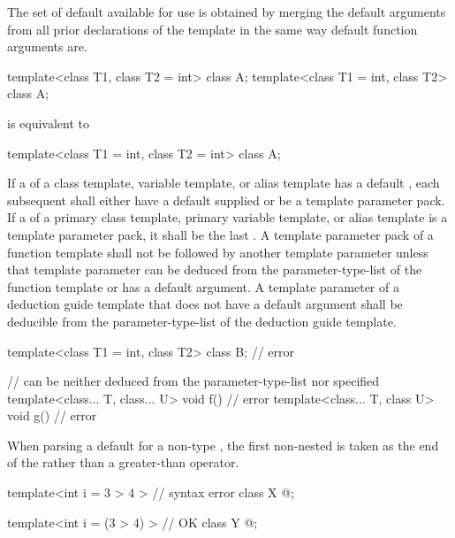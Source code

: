 \pnum
The set of default
available for use is obtained by merging the default arguments
from all prior declarations of the template in the
same way default function arguments are.
\begin{example}
\begin{codeblock}
template<class T1, class T2 = int> class A;
template<class T1 = int, class T2> class A;
\end{codeblock}
is equivalent to
\begin{codeblock}
template<class T1 = int, class T2 = int> class A;
\end{codeblock}
\end{example}

\pnum
If a
of a class template, variable template, or alias template has a default
,
each subsequent
shall either have a default
supplied
or be a template parameter pack. If a 
of a primary class template, primary variable template, or alias template
is a template parameter pack, it shall be the last
.
A template parameter pack of a function template shall not be followed by
another
template parameter unless that template parameter can be deduced from the
parameter-type-list of the function template or has a
default argument.
A template parameter of a deduction guide template
that does not have a default argument
shall be deducible
from the parameter-type-list
of the deduction guide template.
\begin{example}
\begin{codeblock}
template<class T1 = int, class T2> class B;     // error

//  can be neither deduced from the parameter-type-list nor specified
template<class... T, class... U> void f() { }   // error
template<class... T, class U> void g() { }      // error
\end{codeblock}
\end{example}

%
\pnum
When parsing a
default
for a non-type
,
the first non-nested
\tcode{>}
is taken as the end of the
rather than a greater-than operator.
\begin{example}
\begin{codeblock}
template<int i = 3 > 4 >        // syntax error
class X { @\commentellip@ };

template<int i = (3 > 4) >      // OK
class Y { @\commentellip@ };
\end{codeblock}
\end{example}

